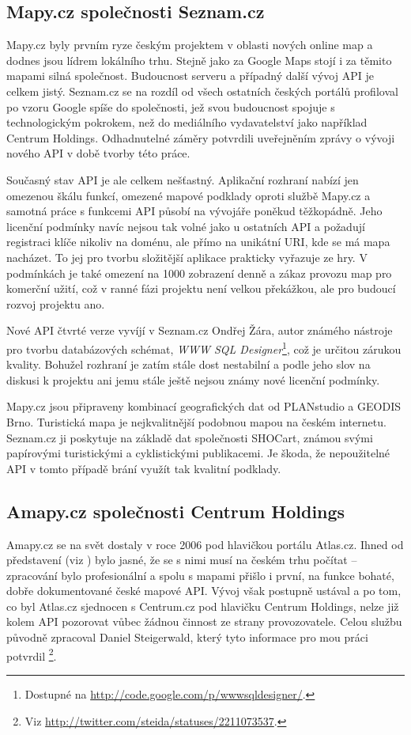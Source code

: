 \subsection{Mapy.cz společnosti Seznam.cz}
Mapy.cz byly prvním ryze českým projektem v oblasti nových online map
a dodnes jsou lídrem lokálního trhu. Stejně jako za Google Maps stojí
i za těmito mapami silná společnost. Budoucnost serveru a případný
další vývoj API je celkem jistý. Seznam.cz se na rozdíl od všech
ostatních českých portálů profiloval po vzoru Google spíše do
společnosti, jež svou budoucnost spojuje s technologickým pokrokem,
než do mediálního vydavatelství jako například Centrum Holdings.
Odhadnutelné záměry potvrdili uveřejněním zprávy o vývoji nového
API \cite{apiSeznam} v době tvorby této práce.

Současný stav API je ale celkem nešťastný. Aplikační rozhraní nabízí
jen omezenou škálu funkcí, omezené mapové podklady oproti službě
Mapy.cz a samotná práce s funkcemi API působí na vývojáře poněkud
těžkopádně. Jeho licenční podmínky navíc nejsou tak volné jako u
ostatních API a požadují registraci klíče nikoliv na doménu, ale
přímo na unikátní URI, kde se má mapa nacházet. To jej pro tvorbu
složitější aplikace prakticky vyřazuje ze hry. V podmínkách je také
omezení na 1000 zobrazení denně a zákaz provozu map pro komerční
užití, což v ranné fázi projektu není velkou překážkou, ale pro
budoucí rozvoj projektu ano.

Nové API čtvrté verze vyvíjí v Seznam.cz Ondřej Žára, autor známého
nástroje pro tvorbu databázových schémat, {\it WWW SQL
Designer}\footnote{Dostupné na
\url{http://code.google.com/p/wwwsqldesigner/}.}, což je určitou zárukou kvality. Bohužel rozhraní je zatím stále dost
nestabilní a podle jeho slov na diskusi k projektu ani jemu stále
ještě nejsou známy nové licenční podmínky.

Mapy.cz jsou připraveny kombinací geografických dat od PLANstudio a
GEODIS Brno. Turistická mapa je nejkvalitnější podobnou mapou na českém
internetu. Seznam.cz ji poskytuje na základě dat společnosti SHOCart,
známou svými papírovými turistickými a cyklistickými publikacemi. Je
škoda, že nepoužitelné API v tomto případě brání využít tak kvalitní
podklady.

\subsection{Amapy.cz společnosti Centrum Holdings}
Amapy.cz se na svět dostaly v roce 2006 pod hlavičkou portálu
Atlas.cz. Ihned od představení (viz \cite{amapy}) bylo jasné, že se s
nimi musí na českém trhu počítat -- zpracování bylo profesionální a spolu s mapami přišlo
i první, na funkce bohaté, dobře dokumentované české mapové API. Vývoj
však postupně ustával a po tom, co byl Atlas.cz sjednocen s
Centrum.cz pod hlavičku Centrum Holdings, nelze již kolem API
pozorovat vůbec žádnou činnost ze strany provozovatele. Celou službu
původně zpracoval Daniel Steigerwald, který tyto informace pro mou
práci potvrdil
\footnote{Viz \url{http://twitter.com/steida/statuses/2211073537}.}.


